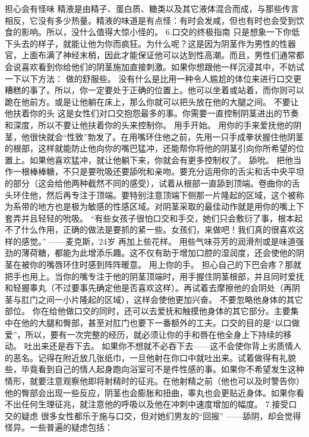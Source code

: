\documentclass[12pt,UTF8]{ctexbook}
\begin{document}
担心会有怪味
精液是由精子、蛋白质、糖类以及其它液体混合而成，与那些传言相反，它没有多少热量。精液的味道是有点怪：有时会发咸，但也有时也会受到饮食的影响。所以，没什么值得大惊小怪的。
6.口交的终极指南
只是想象一下你低下头去的样子，就能让他为你而疯狂。为什么呢？这是因为阴茎作为男性的性器官，上面布满了神经末梢，因此才能保证他可以达到性高潮。而且，男性们通常都会说喜欢看到你给他们的阴茎施加直接刺激。如果你想跟他一样沉浸其中，不妨试一下以下方法：
做的舒服些。
没有什么是比用一种令人尴尬的体位来进行口交更糟糕的事了。所以，你一定要处于正确的位置上。他可以坐着或站着，而你则可以跪在他前方。或是让他躺在床上，那么你就可以把头放在他的大腿之间。
不要让他扶着你的头
这是女性们对口交抱怨最多的事。你需要一直控制阴茎进出的节奏和深度，所以不要让他扶着你的头来控制你。
用手开始。
用你的手来爱抚他的阴茎，他很快就会“性致”勃发了。在用嘴环住他之前，先用一只手成拳状握住他阴茎的根部，这样就能防止他向你的嘴巴猛冲，还能帮你将他的阴茎引向你所希望的位置上。如果他喜欢猛冲，就让他躺下来，你就会有更多控制权了。
舔吮。
把他当作一根棒棒糖，不只是要吮吸还要舔吮和亲吻。要充分运用你的舌尖和舌中央平坦的部分（这会给他两种截然不同的感受），试着从根部一直舔到顶端。卷曲你的舌头环住他，然后再专注于顶端。要特别注意顶端下侧那一片隆起的区域，这个被称为系带的地方也是极为敏感的性感区域。对阴茎采取的最佳动作就是用你的嘴上下套弄并且轻轻的吮吸。
“有些女孩子很怕口交和手交，她们只会敷衍了事，根本起不了什么作用，正确的做法是要抓的紧一些。女孩们，来做吧！我们真的很喜欢这样的感觉。”
——麦克斯，24岁
再加上些花样。
用些气味芬芳的润滑剂或是味道强劲的薄荷糖，都能为此增添乐趣。这不仅有助于增加口腔的湿润度，还会使他的阴茎在被你的嘴唇环住时感到阵阵暖意。
用上你的手。
担心自己的下巴会疼？那就把手也用上。当你的嘴专注于他的阴茎顶端时，用手握住阴茎根部，并且同时爱抚和轻握睾丸（不过要事先确定他是否喜欢这样）。再试着去摩擦他的会阴处（再阴茎与肛门之间一小片隆起的区域），这样会使他更加兴奋。
不要忽略他身体的其它部位。
你在给他做口交的同时，还可以去爱抚和触摸他身体的其它部分。主要集中在他的大腿和臀部，甚至对肛门也要下一番额外的工夫。口交的目的是“以口做爱”，所以，要有一次完整的经历，就必须让你的手和唇在他全身上下持续的移动。
吐出来还是吞下去。
如果你不想就不必吞下去——这不会使你背上劣质情人的恶名。记得在附近放几张纸巾，一旦他射在你口中就吐出来。试着做得有礼貌些，毕竟看到自己的情人起身跑向浴室可不是件性感的事。如果你不希望发生这种情形，就要注意观察他即将射精时的征兆。在他射精之前（他也可以及时警告你）他的臀部会出现一些反应，阴茎也会膨胀和扭曲，睾丸也会更贴近身体。如果你看不出任何生理征兆，就注意他的呼吸以及他在冲刺中速度增加的幅度。
7.接受口交的疑虑
很多女性都乐于施与口交，但对她们男友的“回报” ——舔阴，却会觉得怪异。一些普遍的疑虑包括：
\end{document}
